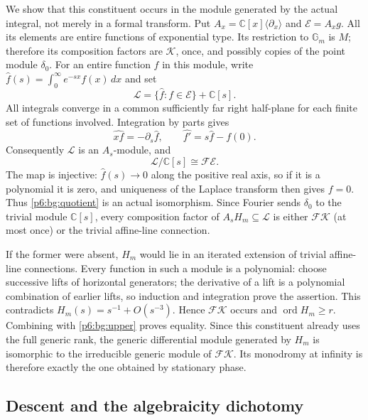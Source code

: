 \documentclass[11pt,a4paper]{article}
\theoremstyle{definition}
\theoremstyle{remark}
\numberwithin{equation}{section}
\begin{document}
We show that this constituent occurs in the module generated by the
actual integral, not merely in a formal transform.  Put
$A_x=\mathbb C[x]\langle\partial_x\rangle$ and
$\mathcal E=A_xg$.  All its elements are entire functions of
exponential type.  Its restriction to $\mathbb G_m$ is $M$;
therefore its composition factors are $\mathcal K$, once, and
possibly copies of the point module $\delta_0$.
For an entire function $f$ in this module, write
$\widehat f(s)=\int_0^\infty e^{-sx}f(x)\,dx$ and set
\[
 \mathcal L=\{\widehat f:f\in\mathcal E\}+\mathbb C[s].
\]
All integrals converge in a common sufficiently far right half-plane
for each finite set of functions involved.  Integration by parts gives
\[
 \widehat{xf}=-\partial_s\widehat f,
 \qquad \widehat{f'}=s\widehat f-f(0).
\]
Consequently $\mathcal L$ is an $A_s$-module, and
\begin{equation}\label{p6:bg:quotient}
 \mathcal L/\mathbb C[s]\cong\mathcal F\mathcal E.
\end{equation}
The map is injective: $\widehat f(s)\to0$ along the positive real
axis, so if it is a polynomial it is zero, and uniqueness of the
Laplace transform then gives $f=0$.  Thus \eqref{p6:bg:quotient} is
an actual isomorphism.  Since Fourier sends $\delta_0$ to the
trivial module $\mathbb C[s]$, every composition factor of
$A_sH_m\subseteq\mathcal L$ is either $\mathcal F\mathcal K$
(at most once) or the trivial affine-line connection.

If the former were absent, $H_m$ would lie in an iterated extension
of trivial affine-line connections.  Every function in such a module
is a polynomial: choose successive lifts of horizontal generators;
the derivative of a lift is a polynomial combination of earlier
lifts, so induction and integration prove the assertion.  This
contradicts $H_m(s)=s^{-1}+O(s^{-3})$.  Hence
$\mathcal F\mathcal K$ occurs and
$\operatorname{ord}H_m\ge r$.  Combining with \eqref{p6:bg:upper}
proves equality.  Since this constituent already uses the full
generic rank, the generic differential module generated by $H_m$
is isomorphic to the irreducible generic module of
$\mathcal F\mathcal K$.  Its monodromy at infinity is therefore
exactly the one obtained by stationary phase.

\subsection{Descent and the algebraicity dichotomy}
\end{document}
